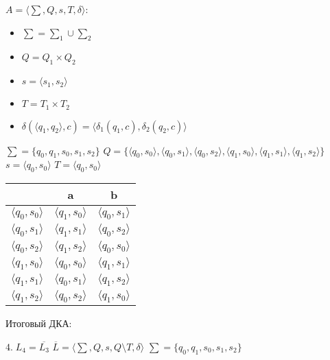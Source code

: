\documentclass[a4paper,12pt]{article}
\begin{document}
$A = {\langle\sum , Q, s, T, \delta \rangle}$:
\begin{itemize}
\item $\sum = \sum_1 \cup \sum_2$
\item $Q = Q_1 \times Q_2$
\item $s = \langle s_1 , s_2\rangle$
\item $T = T_1 \times T_2$
\item $\delta(\langle q_1 , q_2\rangle, c) =  \langle \delta_1 (q_1 , c), \delta_2 (q_2, c) \rangle$
\end{itemize}
$\sum = \{q_0, q_1, s_0, s_1, s_2\}$\newline
\normalsize $Q = \{\langle q_0 , s_0 \rangle ,\langle q_0 , s_1 \rangle ,\langle q_0 , s_2 \rangle , \langle q_1 , s_0 \rangle , \langle q_1 , s_1 \rangle , \langle q_1 , s_2 \rangle \}$\newline
\Large $s = \langle q_0 , s_0 \rangle$\newline
$T = \langle q_0 , s_0 \rangle$\newline
\begin{center}
\begin{tabular}{ |c|c|c| } 
\hline
  & a & b \\ [0.5ex] 
 \hline
 $\langle q_0 , s_0 \rangle $ & $\langle q_1 , s_0 \rangle$ & $\langle q_0 , s_1 \rangle$ \\ 
 $\langle q_0 , s_1 \rangle $ & $\langle q_1 , s_1 \rangle$ & $\langle q_0 , s_2 \rangle$ \\ 
 $\langle q_0 , s_2 \rangle $ & $\langle q_1 , s_2 \rangle$ & $\langle q_0 , s_0 \rangle$ \\ 
 $\langle q_1 , s_0 \rangle $ & $\langle q_0 , s_0 \rangle$ & $\langle q_1 , s_1 \rangle$ \\ 
 $\langle q_1 , s_1 \rangle $ & $\langle q_0 , s_1 \rangle$ & $\langle q_1 , s_2 \rangle$ \\
 $\langle q_1 , s_2 \rangle $ & $\langle q_0 , s_2 \rangle$ & $\langle q_1 , s_0 \rangle$ \\
 \hline
\end{tabular}
\end{center}
Итоговый ДКА:
\begin{center}
\newline
\end{center}
\Large $4.\;L_4 = \overline{L_3}$\newline
$\overline{L} = {\langle\sum , Q, s, Q\setminus T, \delta \rangle}$\newline
$\sum = \{q_0, q_1, s_0, s_1, s_2\}$\newline
\end{document}
